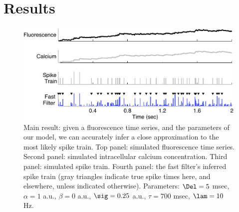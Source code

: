 % 
%
%
%
%
%

\section{Results}

\begin{figure}
\centering \includegraphics[width=.9\linewidth]{schem}
\caption{Main result: given a fluorescence time series, and the parameters of our model, we can accurately infer a close approximation to the most likely spike train.  Top panel: simulated fluorescence time series.  Second panel: simulated intracellular calcium concentration.  Third panel: simulated spike train. Fourth panel: the fast filter's inferred spike train (gray triangles indicate true spike times here, and elsewhere, unless indicated otherwise).  Parameters: $\Del=5$ msec, $\alpha=1$ a.u., $\beta=0$ a.u., $\sig=0.25$ a.u., $\tau=700$ msec, $\lam=10$ Hz.} \label{fig:schem}
\end{figure}

